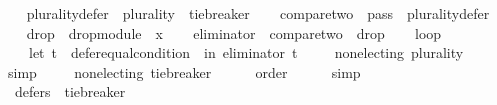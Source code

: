 \begin{isabellebody}
\ \ \isamarkupfalse%
\ {\isacharquery}{\kern0pt}plurality{\isacharunderscore}{\kern0pt}defer\ {\isacharequal}{\kern0pt}\ {\isachardoublequoteopen}{\isacharparenleft}{\kern0pt}plurality{\isasymdown}{\isacharparenright}{\kern0pt}\ {\isasymtriangleright}\ {\isacharquery}{\kern0pt}tie{\isacharunderscore}{\kern0pt}breaker{\isachardoublequoteclose}\isanewline
\ \ \isamarkupfalse%
\ {\isacharquery}{\kern0pt}compare{\isacharunderscore}{\kern0pt}two\ {\isacharequal}{\kern0pt}\ {\isachardoublequoteopen}{\isacharquery}{\kern0pt}pass{}\ {\isasymtriangleright}\ {\isacharquery}{\kern0pt}plurality{\isacharunderscore}{\kern0pt}defer{\isachardoublequoteclose}\isanewline
\ \ \isamarkupfalse%
\ {\isacharquery}{\kern0pt}drop{}\ {\isacharequal}{\kern0pt}\ {\isachardoublequoteopen}drop{\isacharunderscore}{\kern0pt}module\ {}\ x{\isachardoublequoteclose}\isanewline
\ \ \isamarkupfalse%
\ {\isacharquery}{\kern0pt}eliminator\ {\isacharequal}{\kern0pt}\ {\isachardoublequoteopen}{\isacharquery}{\kern0pt}compare{\isacharunderscore}{\kern0pt}two\ {\isasymparallel}\isactrlsub {\isasymup}\ {\isacharquery}{\kern0pt}drop{}{\isachardoublequoteclose}\isanewline
\ \ \isamarkupfalse%
\ {\isacharquery}{\kern0pt}loop\ {\isacharequal}{\kern0pt}\isanewline
\ \ \ \ {\isachardoublequoteopen}let\ t\ {\isacharequal}{\kern0pt}\ defer{\isacharunderscore}{\kern0pt}equal{\isacharunderscore}{\kern0pt}condition\ {}\ in\ {\isacharparenleft}{\kern0pt}{\isacharquery}{\kern0pt}eliminator\ {\isasymcirclearrowleft}\isactrlsub t{\isacharparenright}{\kern0pt}{\isachardoublequoteclose}\isanewline
\isanewline
\ \ \isamarkupfalse%
\ {}{}{}{}{}{\isacharcolon}{\kern0pt}\ {\isachardoublequoteopen}non{\isacharunderscore}{\kern0pt}electing\ {\isacharparenleft}{\kern0pt}plurality{\isasymdown}{\isacharparenright}{\kern0pt}{\isachardoublequoteclose}\isanewline
\ \ \ \ \isamarkupfalse%
\ simp\isanewline
\ \ \isamarkupfalse%
\ {}{}{}{}{}{\isacharcolon}{\kern0pt}\ {\isachardoublequoteopen}non{\isacharunderscore}{\kern0pt}electing\ {\isacharquery}{\kern0pt}tie{\isacharunderscore}{\kern0pt}breaker{\isachardoublequoteclose}\isanewline
\ \ \ \ \isamarkupfalse%
\ order\isanewline
\ \ \ \ \isamarkupfalse%
\ simp\isanewline
\ \ \isamarkupfalse%
\ {}{}{}{}{}{\isacharcolon}{\kern0pt}\ {\isachardoublequoteopen}defers\ {}\ {\isacharquery}{\kern0pt}tie{\isacharunderscore}{\kern0pt}breaker{\isachardoublequoteclose}\isanewline

\end{isabellebody}
